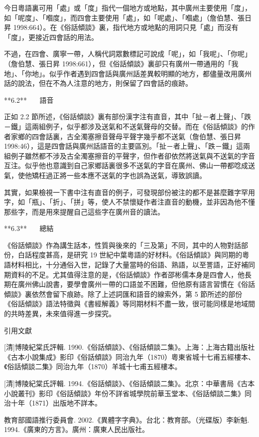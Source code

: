 今日粵語裏可用「處」或「度」指代一個地方或地點，其中廣州主要使用「度」，如「呢度」、「嗰度」，而四會主要使用「處」，如「呢處」、「嗰處」（詹伯慧、張日昇 1998:664）。在《俗話傾談》裏，指代地方或地點的用詞只見「處」而沒有「度」，更接近四會話的用法。

不過，在四會、廣寧一帶，人稱代詞眾數標記可說成「呢」，如「我呢」、「你呢」（詹伯慧、張日昇 1998:661），但《俗話傾談》裏卻只有廣州一帶通用的「我地」、「你地」。似乎作者遇到四會話與廣州話差異較明顯的地方，都儘量改用廣州話的說法，但在不為人注意的地方，則保留了四會話的痕跡。

**6.2**    語音

正如 2.2 節所述，《俗話傾談》裏有部份漢字注有直音，其中「扯－者上聲」、「跌－鐵」這兩組例子，似乎都涉及送氣和不送氣聲母的交替。而在《俗話傾談》的作者家鄉的四會話裏，古全濁塞擦音聲母平聲字幾乎都不送氣（詹伯慧、張日昇 1998:46），這是四會話與廣州話語音的主要區別。「扯－者上聲」、「跌－鐵」這兩組例子雖然都不涉及古全濁塞擦音的平聲字，但作者卻依然將送氣與不送氣的字音互注。似乎他也意識到自己家鄉話裏很多不送氣的字音在廣州、佛山一帶都唸成送氣，使他矯枉過正將一些本應不送氣的字也誤為送氣，導致誤讀。

其實，如果檢視一下書中注有直音的例子，可發現部份被注的都不是甚麼難字罕用字，如「瓶」、「折」、「拼」等，使人不禁懷疑作者注直音的動機，並非因為他不懂那些字，而是用來提醒自己這些字在廣州音的讀法。

**6.3**    總結

《俗話傾談》作為講生話本，性質與後來的「三及第」不同，其中的人物對話部份，白話程度甚高，是研究 19 世紀中葉粵語的好材料。《俗話傾談》與同期的粵語材料相比，十分通俗入世，記錄了大量當時的俗語、熟語，以至詈語，正好補同期資料的不足。尤其值得注意的是，《俗話傾談》作者邵彬儒本身是四會人，他長期在廣州佛山說書，要學會廣州一帶的口語並不困難，但他原有語言習慣在《俗話傾談》裏依然會留下痕跡。除了上述詞匯和語音的線索外，第 5 節所述的部份《俗話傾談》語法特徵與《書經解義》等同期材料不盡一致，很可能同樣是地域間的共時差異，未來值得進一步探究。

引用文獻

[清]博陵紀棠氏評輯. 1990.《俗話傾談》、《俗話傾談二集》。上海：上海古籍出版社《古本小說集成》影印《俗話傾談》同治九年（1870）粵東省城十七甫五經樓本、《俗話傾談二集》同治九年（1870）羊城十七甫五經樓本。

[清]博陵紀棠氏評輯. 1994.《俗話傾談》、《俗話傾談二集》。北京：中華書局《古本小說叢刊》影印《俗話傾談》年份不詳省城學院前華玉堂本、《俗話傾談二集》同治十年（1871）出版地不詳本。

教育部國語推行委員會. 2002.《異體字字典》。台北：教育部。（光碟版）李新魁. 1994.《廣東的方言》。廣州：廣東人民出版社。

